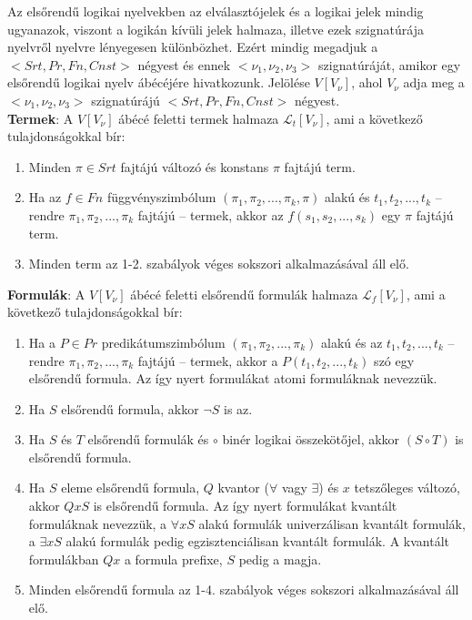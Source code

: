 \documentclass[margin=0px]{article}
\begin{document}
Az elsőrendű logikai nyelvekben az elválasztójelek és a logikai jelek mindig ugyanazok, viszont
a logikán kívüli jelek halmaza, illetve ezek szignatúrája nyelvről nyelvre lényegesen különbözhet.
Ezért mindig megadjuk a $<Srt, Pr, Fn, Cnst>$ négyest és ennek $<\nu_{1}, \nu_{2}, \nu_{3}>$
szignatúráját, amikor egy elsőrendű logikai nyelv ábécéjére hivatkozunk. Jelölése $V[V_{\nu}]$,
ahol $V_{\nu}$ adja meg a $<\nu_{1}, \nu_{2}, \nu_{3}>$ szignatúrájú $<Srt, Pr, Fn, Cnst>$ négyest.\\

\noindent \textbf{Termek}: A $V[V_{\nu}]$ ábécé feletti termek halmaza $\mathcal{L}_{t}[V_{\nu}]$, ami
a következő tulajdonságokkal bír:

\begin{enumerate}
    \item	Minden $\pi \in Srt$ fajtájú változó és konstans $\pi$ fajtájú term.

    \item	Ha az $f \in Fn$ függvényszimbólum $(\pi_{1}, \pi_{2}, ..., \pi_{k}, \pi)$ alakú
          és $t_{1}, t_{2}, ..., t_{k}$ -- rendre $\pi_{1}, \pi_{2}, ..., \pi_{k}$ fajtájú -- termek,
          akkor az $f(s_{1}, s_{2}, ..., s_{k})$ egy $\pi$ fajtájú term.

    \item	Minden term az 1-2. szabályok véges sokszori alkalmazásával áll elő.
\end{enumerate}

\noindent \textbf{Formulák}: A $V[V_{\nu}]$ ábécé feletti elsőrendű formulák halmaza $\mathcal{L}_{f}[V_{\nu}]$, ami
a következő tulajdonságokkal bír:

\begin{enumerate}
    \item	Ha a $P \in Pr$ predikátumszimbólum $(\pi_{1}, \pi_{2}, ..., \pi_{k})$ alakú
          és az $t_{1}, t_{2}, ..., t_{k}$ -- rendre $\pi_{1}, \pi_{2}, ..., \pi_{k}$ fajtájú --
          termek, akkor a $P(t_{1}, t_{2}, ..., t_{k})$ szó egy elsőrendű formula.
          Az így nyert formulákat atomi formuláknak nevezzük.

    \item	Ha $S$ elsőrendű formula, akkor $\neg S$ is az.

    \item	Ha $S$ és $T$ elsőrendű formulák és $\circ$ binér logikai összekötőjel,
          akkor $(S \circ T)$ is elsőrendű formula.

    \item	Ha $S$ eleme elsőrendű formula, $Q$ kvantor ($\forall$ vagy $\exists$) és $x$
          tetszőleges változó, akkor $QxS$ is elsőrendű formula. Az így nyert formulákat kvantált formuláknak nevezzük,
          a $\forall xS$ alakú formulák univerzálisan kvantált formulák, a $\exists xS$ alakú formulák
          pedig egzisztenciálisan kvantált formulák. A kvantált formulákban $Qx$ a formula prefixe, $S$
          pedig a magja.

    \item	Minden elsőrendű formula az 1-4. szabályok véges sokszori alkalmazásával áll elő.
\end{enumerate}
\end{document}

